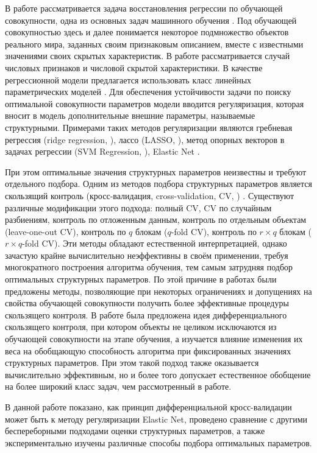 В работе рассматривается задача восстановления регрессии по обучающей совокупности, одна из основных задач машинного обучения \cite{vap99}. 
Под обучающей совокупностью здесь и далее понимается некоторое подмножество объектов реального мира, заданных своим признаковым описанием, вместе с известными значениями своих скрытых характеристик. 
В работе рассматривается случай числовых признаков и числовой скрытой характеристики.
В качестве регрессионной модели предлагается использовать класс линейных параметрических моделей \cite{ivch09}. 
Для обеспечения устойчивости задачи по поиску оптимальной совокупности параметров модели вводится регуляризация, которая вносит в модель дополнительные внешние параметры, называемые структурными.
Примерами таких методов регуляризации являются гребневая регрессия (ridge regression, \cite{hoerl70}), лассо (LASSO, \cite{tib96}), метод опорных векторов в задачах регрессии (SVM Regression, \cite{dru96}), Elastic Net \cite{zou05}.

При этом оптимальные значения структурных параметров неизвестны и требуют отдельного подбора. 
Одним из методов подбора структурных параметров является скользящий контроль (кросс-валидация, cross-validation, CV, \cite{voron}) .
Существуют различные модификации этого подхода: полный CV, CV по случайным разбиениям, контроль по отложенным данным, контроль по отдельным объектам (leave-one-out CV), контроль по $q$ блокам ($q$-fold CV), контроль по $r\times q$ блокам ($r\times q$-fold CV). 
Эти методы обладают естественной интерпретацией, однако зачастую крайне вычислительно неэффективны в своём применении, требуя многократного построения алгоритма обучения, тем самым затрудняя подбор оптимальных структурных параметров. 
По этой причине в работах \cite{cawley,che14} были предложены методы, позволяющие при некоторых ограничениях и допущениях на свойства обучающей совокупности получить более эффективные процедуры скользящего контроля.
В работе \cite{gre12} была предложена идея дифференциального скользящего контроля, при котором объекты не целиком исключаются из обучающей совокупности на этапе обучения, 
а изучается влияние изменения их веса на обобщающую способность алгоритма при фиксированных значениях структурных параметров. 
При этом такой подход также оказывается вычислительно эффективным, но и более того допускает естественное обобщение на более широкий класс задач, чем рассмотренный в работе.

В данной работе показано, как принцип дифференциальной кросс-валидации может быть к методу регуляризации Elastic Net, 
проведено сравнение с другими беспереборными подходами оценки структурных параметров, а также экспериментально изучены различные способы подбора оптимальных параметров.
